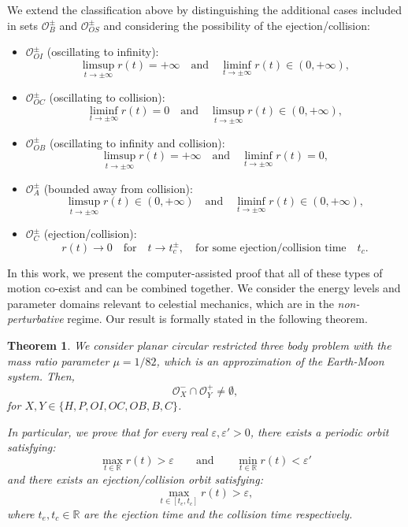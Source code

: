 \documentclass[1p]{article}
\newtheorem{theorem}{Theorem}
\begin{document}
We extend the classification above by distinguishing the additional cases included in sets $\mathcal{O}_B^\pm$ and $\mathcal{O}_{OS}^\pm$ and considering the possibility of the ejection/collision:
\begin{itemize}
    \item $\mathcal{O}_{OI}^{\pm}$ (oscillating to infinity): 
    \[
        \limsup_{t \to \pm \infty} r(t)= + \infty \quad\text{and}\quad
        \liminf_{t \to \pm \infty} r(t) \in (0, +\infty),
    \]
    \item $\mathcal{O}_{OC}^{\pm}$ (oscillating to collision):
	\[
        \liminf_{t \to \pm \infty} r(t) = 0  \quad\text{and}\quad \limsup_{t \to \pm \infty} r(t) \in (0,+\infty),
    \]
    \item $\mathcal{O}_{OB}^{\pm}$ (oscillating to infinity and collision):
	\[
        \limsup_{t \to \pm \infty} r(t)= + \infty \quad\text{and}\quad \liminf_{t \to \pm \infty} r(t) = 0,
    \]
    \item $\mathcal{O}_A^{\pm}$ (bounded away from collision):
    \[
        \limsup_{t\to \pm \infty} r(t) \in (0,+\infty) \quad\text{and}\quad \liminf_{t \to \pm \infty} r(t) \in (0,+\infty),
    \]
    \item $\mathcal{O}_C^{\pm}$ (ejection/collision): 
    \[
        r(t)\to 0 \quad\text{for}\quad t\to t_c^{\pm},\quad\text{for some ejection/collision time}\quad t_c.
    \]
\end{itemize}

In this work, we present the computer-assisted proof that all of these types of motion co-exist and can be combined together. We consider the energy levels and parameter domains relevant to celestial mechanics, which are in the {\em non-perturbative} regime. Our result is formally stated in the following theorem.

\begin{theorem}
    \label{thm:primary_result}
    We consider planar circular restricted three body problem with the mass ratio parameter $\mu=1/82$, which is an approximation of the Earth-Moon system. Then,
    \begin{equation}
        \label{eq:main}
        \mathcal{O}_X^- \cap \mathcal{O}_Y^+ \ne \emptyset,
    \end{equation}
    for $X,Y \in \{H,P,OI,OC,OB,B,C\}$. 

    In particular, we prove that for every real $\varepsilon, \varepsilon' > 0$, there exists a periodic orbit satisfying:
    \[
        \max_{t\in \mathbb{R}} r(t) > \varepsilon \qquad \mbox{and} \qquad \min_{t\in \mathbb{R}} r(t) < \varepsilon'
    \]
    and there exists an ejection/collision orbit satisfying:
    \[
        \max_{t \in [t_e,t_c]} r(t) > \varepsilon,
    \]
    where $t_e,t_c \in \mathbb{R}$ are the ejection time and the collision time respectively.
\end{theorem}
\end{document}
